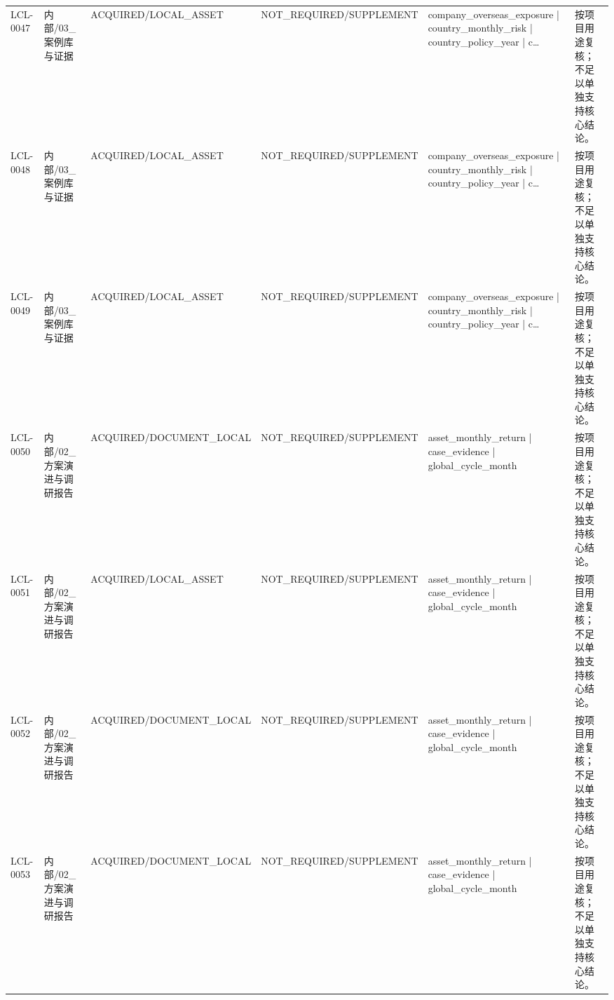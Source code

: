 \begin{landscape}
\begin{longtable}{p{1.8cm}p{2.6cm}p{2.6cm}p{2.6cm}p{4.8cm}p{7.2cm}}
LCL-0047 & 内部/\allowbreak{}03\_\allowbreak{}案例库与证据 & ACQUIRED/\allowbreak{}LOCAL\_\allowbreak{}ASSET & NOT\_\allowbreak{}REQUIRED/\allowbreak{}SUPPLEMENT & company\_\allowbreak{}overseas\_\allowbreak{}exposure | country\_\allowbreak{}monthly\_\allowbreak{}risk | country\_\allowbreak{}policy\_\allowbreak{}year | c… & 按项目用途复核；不足以单独支持核心结论。\\
LCL-0048 & 内部/\allowbreak{}03\_\allowbreak{}案例库与证据 & ACQUIRED/\allowbreak{}LOCAL\_\allowbreak{}ASSET & NOT\_\allowbreak{}REQUIRED/\allowbreak{}SUPPLEMENT & company\_\allowbreak{}overseas\_\allowbreak{}exposure | country\_\allowbreak{}monthly\_\allowbreak{}risk | country\_\allowbreak{}policy\_\allowbreak{}year | c… & 按项目用途复核；不足以单独支持核心结论。\\
LCL-0049 & 内部/\allowbreak{}03\_\allowbreak{}案例库与证据 & ACQUIRED/\allowbreak{}LOCAL\_\allowbreak{}ASSET & NOT\_\allowbreak{}REQUIRED/\allowbreak{}SUPPLEMENT & company\_\allowbreak{}overseas\_\allowbreak{}exposure | country\_\allowbreak{}monthly\_\allowbreak{}risk | country\_\allowbreak{}policy\_\allowbreak{}year | c… & 按项目用途复核；不足以单独支持核心结论。\\
LCL-0050 & 内部/\allowbreak{}02\_\allowbreak{}方案演进与调研报告 & ACQUIRED/\allowbreak{}DOCUMENT\_\allowbreak{}LOCAL & NOT\_\allowbreak{}REQUIRED/\allowbreak{}SUPPLEMENT & asset\_\allowbreak{}monthly\_\allowbreak{}return | case\_\allowbreak{}evidence | global\_\allowbreak{}cycle\_\allowbreak{}month & 按项目用途复核；不足以单独支持核心结论。\\
LCL-0051 & 内部/\allowbreak{}02\_\allowbreak{}方案演进与调研报告 & ACQUIRED/\allowbreak{}LOCAL\_\allowbreak{}ASSET & NOT\_\allowbreak{}REQUIRED/\allowbreak{}SUPPLEMENT & asset\_\allowbreak{}monthly\_\allowbreak{}return | case\_\allowbreak{}evidence | global\_\allowbreak{}cycle\_\allowbreak{}month & 按项目用途复核；不足以单独支持核心结论。\\
LCL-0052 & 内部/\allowbreak{}02\_\allowbreak{}方案演进与调研报告 & ACQUIRED/\allowbreak{}DOCUMENT\_\allowbreak{}LOCAL & NOT\_\allowbreak{}REQUIRED/\allowbreak{}SUPPLEMENT & asset\_\allowbreak{}monthly\_\allowbreak{}return | case\_\allowbreak{}evidence | global\_\allowbreak{}cycle\_\allowbreak{}month & 按项目用途复核；不足以单独支持核心结论。\\
LCL-0053 & 内部/\allowbreak{}02\_\allowbreak{}方案演进与调研报告 & ACQUIRED/\allowbreak{}DOCUMENT\_\allowbreak{}LOCAL & NOT\_\allowbreak{}REQUIRED/\allowbreak{}SUPPLEMENT & asset\_\allowbreak{}monthly\_\allowbreak{}return | case\_\allowbreak{}evidence | global\_\allowbreak{}cycle\_\allowbreak{}month & 按项目用途复核；不足以单独支持核心结论。\\

\end{longtable}
\end{landscape}
